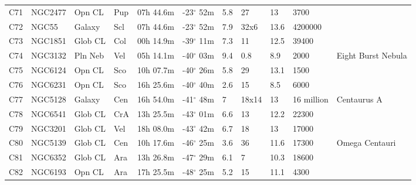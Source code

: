 \begin{longtable}{@{}lllllllllll@{}}
C71        & NGC2477     & Opn CL     & Pup       & 07h 44.6m & -23$^{\circ}$ 52m  & 5.8       & 27                   & 13       & 3700                &                                 \\
C72        & NGC55       & Galaxy     & Scl       & 07h 44.6m & -23$^{\circ}$ 52m  & 7.9       & 32x6                 & 13.6     & 4200000             &                                 \\
C73        & NGC1851     & Glob CL    & Col       & 00h 14.9m & -39$^{\circ}$ 11m  & 7.3       & 11                   & 12.5     & 39400               &                                 \\
C74        & NGC3132     & Pln Neb    & Vel       & 05h 14.1m & -40$^{\circ}$ 03m  & 9.4       & 0.8                  & 8.9      & 2000                & Eight Burst Nebula              \\
C75        & NGC6124     & Opn CL     & Sco       & 10h 07.7m & -40$^{\circ}$ 26m  & 5.8       & 29                   & 13.1     & 1500                &                                 \\
C76        & NGC6231     & Opn CL     & Sco       & 16h 25.6m & -40$^{\circ}$ 40m  & 2.6       & 15                   & 8.5      & 6000                &                                 \\
C77        & NGC5128     & Galaxy     & Cen       & 16h 54.0m & -41$^{\circ}$ 48m  & 7         & 18x14                & 13       & 16 million          & Centaurus A                     \\
C78        & NGC6541     & Glob CL    & CrA       & 13h 25.5m & -43$^{\circ}$ 01m  & 6.6       & 13                   & 12.2     & 22300               &                                 \\
C79        & NGC3201     & Glob CL    & Vel       & 18h 08.0m & -43$^{\circ}$ 42m  & 6.7       & 18                   & 13       & 17000               &                                 \\
C80        & NGC5139     & Glob CL    & Cen       & 10h 17.6m & -46$^{\circ}$ 25m  & 3.6       & 36                   & 11.6     & 17300               & Omega Centauri                  \\
C81        & NGC6352     & Glob CL    & Ara       & 13h 26.8m & -47$^{\circ}$ 29m  & 6.1       & 7                    & 10.3     & 18600               &                                 \\
C82        & NGC6193     & Opn CL     & Ara       & 17h 25.5m & -48$^{\circ}$ 25m  & 5.2       & 15                   & 11.1     & 4300                &                                 \\

\end{longtable}
